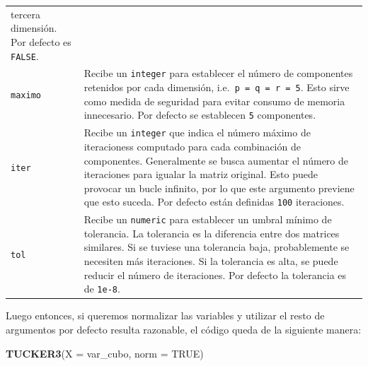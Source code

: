 \documentclass[
  spanish,
]{article}
\newenvironment{Shaded}{\begin{snugshade}}{\end{snugshade}}
\newcommand{\DataTypeTok}[1]{\textcolor[rgb]{0.13,0.29,0.53}{#1}}
\newcommand{\KeywordTok}[1]{\textcolor[rgb]{0.13,0.29,0.53}{\textbf{#1}}}
\newcommand{\NormalTok}[1]{#1}
\newcommand{\OtherTok}[1]{\textcolor[rgb]{0.56,0.35,0.01}{#1}}
\begin{document}
\begin{longtable}[]{@{}ll@{}}
\begin{minipage}[t]{0.72\columnwidth}
tercera dimensión. Por defecto es \texttt{FALSE}.\strut
\end{minipage}\tabularnewline
\begin{minipage}[t]{0.14\columnwidth}\raggedright
\texttt{maximo}\strut
\end{minipage} & \begin{minipage}[t]{0.72\columnwidth}\raggedright
Recibe un \texttt{integer} para establecer el número de componentes
retenidos por cada dimensión, i.e.~\texttt{p\ =\ q\ =\ r\ =\ 5}. Esto sirve
como medida de seguridad para evitar consumo de memoria
innecesario. Por defecto se establecen \texttt{5} componentes.\strut
\end{minipage}\tabularnewline
\begin{minipage}[t]{0.14\columnwidth}\raggedright
\texttt{iter}\strut
\end{minipage} & \begin{minipage}[t]{0.72\columnwidth}\raggedright
Recibe un \texttt{integer} que indica el número máximo de iteracioness
computado para cada combinación de componentes. Generalmente
se busca aumentar el número de iteraciones para igualar la
matriz original. Esto puede provocar un bucle infinito, por
lo que este argumento previene que esto suceda. Por defecto
están definidas \texttt{100} iteraciones.\strut
\end{minipage}\tabularnewline
\begin{minipage}[t]{0.14\columnwidth}\raggedright
\texttt{tol}\strut
\end{minipage} & \begin{minipage}[t]{0.72\columnwidth}\raggedright
Recibe un \texttt{numeric} para establecer un umbral mínimo de
tolerancia. La tolerancia es la diferencia entre dos matrices
similares. Si se tuviese una tolerancia baja, probablemente
se necesiten más iteraciones. Si la tolerancia es alta, se
puede reducir el número de iteraciones. Por defecto la
tolerancia es de \texttt{1e-8}.\strut
\end{minipage}\tabularnewline
\bottomrule
\end{longtable}

Luego entonces, si queremos normalizar las variables y utilizar el resto de argumentos por defecto resulta razonable, el código queda de la siguiente manera:

\begin{Shaded}
\begin{Highlighting}[]
\KeywordTok{TUCKER3}\NormalTok{(}\DataTypeTok{X =}\NormalTok{ var\_cubo, }\DataTypeTok{norm =} \OtherTok{TRUE}\NormalTok{)}
\end{Highlighting}
\end{Shaded}
\end{document}
